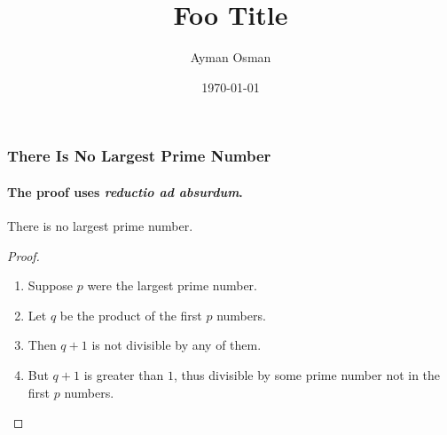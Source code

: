 \documentclass{beamer}
\begin{document}
\title{Foo Title}   
\author{Ayman Osman} 
\date{\today} 

\frame{\titlepage} 




\begin{frame}
  \frametitle{There Is No Largest Prime Number}
  \framesubtitle{The proof uses \textit{reductio ad absurdum}.}
  \begin{theorem}
    There is no largest prime number.
  \end{theorem}
  \begin{proof}
    \begin{enumerate}
    \item<1-| alert@1> Suppose $p$ were the largest prime number.
    \item<2-> Let $q$ be the product of the first $p$ numbers.
    \item<3-> Then $q+1$ is not divisible by any of them.
    \item<1-> But $q + 1$ is greater than $1$, thus divisible by some prime
      number not in the first $p$ numbers.\qedhere
    \end{enumerate}
  \end{proof}
\end{frame}
\end{document}

